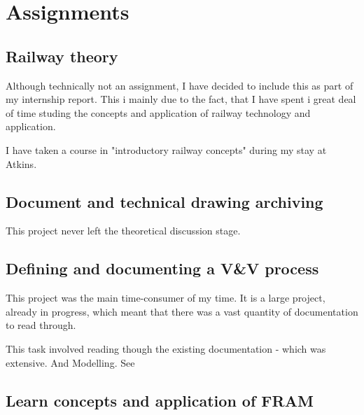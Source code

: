 \chapter{Assignments}

\section{Railway theory}
Although technically not an assignment, I have decided to include this as part of my internship report. This i mainly due to the fact, that I have spent i great deal of time studing the concepts and application of railway technology and application.

I have taken a course in "introductory railway concepts" during my stay at Atkins.


\section{Document and technical drawing archiving}

This project never left the theoretical discussion stage.

\section{Defining and documenting a V\&V process}
This project was the main time-consumer of my time. It is a large project, already in progress, which meant that there was a vast quantity of documentation to read through.

This task involved reading though the existing documentation - which was extensive. And Modelling. See \cite{Rostgaard_VandV:2011}



\section{Learn concepts and application of FRAM}
